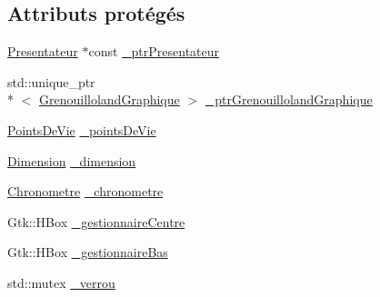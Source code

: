 \subsection*{Attributs protégés}
\begin{DoxyCompactItemize}
\item 
\hyperlink{classgrenouilloland_1_1Presentateur}{Presentateur} $\ast$const \hyperlink{classgrenouilloland_1_1Vue_a18b21aec8d74287eb28374399827c022}{\-\_\-ptr\-Presentateur}
\item 
std\-::unique\-\_\-ptr\\*
$<$ \hyperlink{classgrenouilloland_1_1GrenouillolandGraphique}{Grenouilloland\-Graphique} $>$ \hyperlink{classgrenouilloland_1_1Vue_a998feee5bed8136f999d2e3484d0c6ca}{\-\_\-ptr\-Grenouilloland\-Graphique}
\item 
\hyperlink{classgrenouilloland_1_1PointsDeVie}{Points\-De\-Vie} \hyperlink{classgrenouilloland_1_1Vue_af6f2bba3b33001e5c0807d8e98c0b0fa}{\-\_\-points\-De\-Vie}
\item 
\hyperlink{classgrenouilloland_1_1Dimension}{Dimension} \hyperlink{classgrenouilloland_1_1Vue_a8913ac00882895d6a0552edc92266883}{\-\_\-dimension}
\item 
\hyperlink{classgrenouilloland_1_1Chronometre}{Chronometre} \hyperlink{classgrenouilloland_1_1Vue_a6632cb40512ad2d01c9a52b33de24aeb}{\-\_\-chronometre}
\item 
Gtk\-::\-H\-Box \hyperlink{classgrenouilloland_1_1Vue_a64a3b9c74425f9a70fbae4c5bc7d9c78}{\-\_\-gestionnaire\-Centre}
\item 
Gtk\-::\-H\-Box \hyperlink{classgrenouilloland_1_1Vue_a65d5b3129325746ee1d1dbf0c3f3e0db}{\-\_\-gestionnaire\-Bas}
\item 
std\-::mutex \hyperlink{classgrenouilloland_1_1Vue_ab6f850d86942bdef050596e90a34494e}{\-\_\-verrou}
\end{DoxyCompactItemize}
